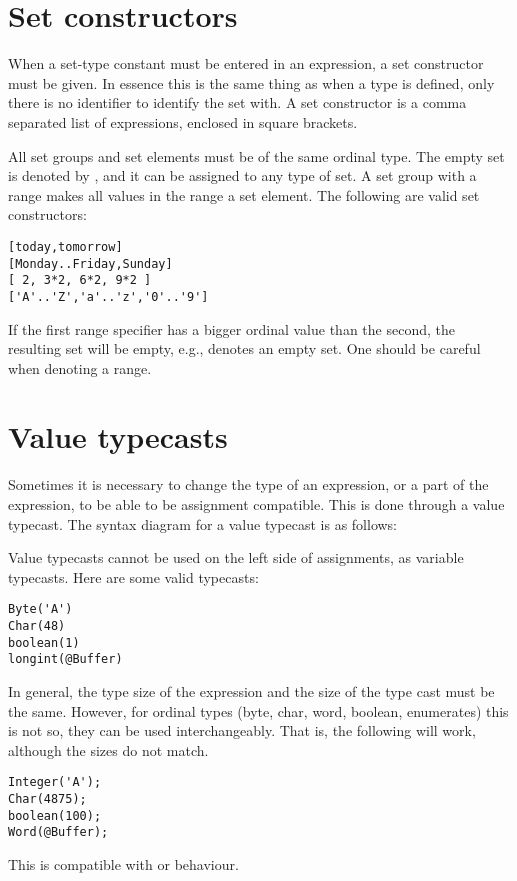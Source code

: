 \section{Set constructors}
When a set-type constant must be entered in an expression, a
set constructor must be given. In essence this is the same thing as when a
type is defined, only there is no identifier to identify the set with.
A set constructor is a comma separated list of expressions, enclosed in
square brackets.

All set groups and set elements must be of the same ordinal type.
The empty set is denoted by \var{[]}, and it can be assigned to any type of
set. A set group with a range  \var{[A..Z]} makes all values in the range a
set element. 
The following are valid set constructors:
\begin{verbatim}
[today,tomorrow]
[Monday..Friday,Sunday]
[ 2, 3*2, 6*2, 9*2 ]
['A'..'Z','a'..'z','0'..'9']
\end{verbatim}
\begin{remark}
If the first range specifier has a bigger ordinal value than
the second, the resulting set will be empty, e.g., \var{['Z'..'A']} 
denotes an empty set. One should be careful when denoting a range.
\end{remark}

\section{Value typecasts}

Sometimes it is necessary to change the type of an expression, or a part of
the expression, to be able to be assignment compatible. This is done through
a value typecast. The syntax diagram for a value typecast is as follows:

Value typecasts cannot be used on the left side of assignments, as variable
typecasts.
Here are some valid typecasts:
\begin{verbatim}
Byte('A')
Char(48)
boolean(1)
longint(@Buffer)
\end{verbatim}
In general, the type size of the expression and the size of the type cast 
must be the same. However, for ordinal types (byte, char, word, boolean,
enumerates) this is not so, they can be used interchangeably. 
That is, the following will work, although the sizes do not match.
\begin{verbatim}
Integer('A');
Char(4875);
boolean(100);
Word(@Buffer);
\end{verbatim}
This is compatible with \delphi or \tp behaviour.

